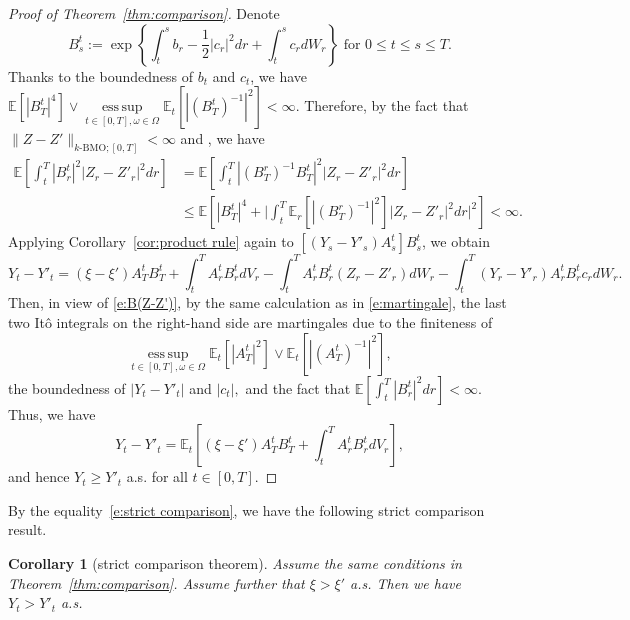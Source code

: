 \documentclass[11pt,reqno]{amsart}
\def\E{\mathbb E}
\newtheorem{corollary}{Corollary}[section]
\DeclareMathOperator*{\esssup}{ess\,sup}
\numberwithin{equation}{section}
\begin{document}
\begin{proof}[Proof of Theorem~\ref{thm:comparison}]
Denote 
\[B^{t}_{s}:=\exp\left\{\int_{t}^{s}b_{r} - \frac{1}{2}|c_{r}|^{2}dr + \int_{t}^{s}c_{r}dW_r\right\} \text{ for } 0\le t\le s\le T.\] Thanks to the boundedness of $b_{t}$ and $c_t$, we have $\mathbb{E}\left[|B^{t}_{T}|^{4}\right]\vee\esssup\limits_{t\in[0,T],\omega\in\Omega}\mathbb{E}_{t}\left[|(B^{t}_{T})^{-1}|^{2}\right]<\infty.$ 
Therefore, by the fact that $\|Z-Z'\|_{k\text{-BMO};[0,T]}<\infty$ and \cite[Corollary~2.1]{kazamaki1994continuous}, we have
\begin{equation}\label{e:B(Z-Z')}
\begin{aligned}
\mathbb{E}\left[\int_{t}^{T}|B^{t}_{r}|^{2}|Z_{r} - Z'_{r}|^{2}dr\right] 
&= \mathbb{E}\left[\int_{t}^{T}\left|(B^{r}_{T})^{-1}B^{t}_{T}\right|^{2}|Z_{r} - Z'_{r}|^{2}dr\right]\\
&\le \mathbb{E}\left[|B_T^t|^4+ \Big|\int_{t}^{T}\mathbb{E}_{r}\left[|(B_T^r)^{-1}|^2\right] |Z_{r} - Z'_{r}|^{2}dr\Big|^{2}\right]<\infty.
\end{aligned}
\end{equation}
Applying Corollary~\ref{cor:product rule} again to $[(Y_s - Y'_s)A^{t}_{s}]B^{t}_s$, we obtain
\begin{equation*}
Y_t - Y'_t = (\xi - \xi')A^{t}_{T}B^{t}_{T} + \int_{t}^{T}A^{t}_r B^{t}_r dV_r - \int_{t}^{T} A^{t}_rB^{t}_r (Z_r - Z'_r) dW_r  - \int_{t}^{T} (Y_r - Y'_r) A^{t}_{r}B^{t}_r c_r dW_r.
\end{equation*}
Then, in view of \eqref{e:B(Z-Z')}, by the same calculation as in \eqref{e:martingale}, the last two It\^o integrals on the right-hand side are martingales due to the finiteness of 
\[\esssup\limits_{t\in[0,T],\omega\in\Omega}\mathbb{E}_{t}\left[|A^{t}_{T}|^{2}\right]\vee\mathbb{E}_{t}\left[|(A^{t}_{T})^{-1}|^{2}\right],\]
the boundedness of $|Y_t-Y'_t|$ and $|c_t|,$ and the fact that $\E[\int_{t}^{T}|B^{t}_{r}|^{2}dr]<\infty$.  Thus, we have 
\begin{equation}\label{e:strict comparison}
Y_t-Y'_t = \mathbb{E}_{t}\left[(\xi - \xi')A^{t}_{T}B^{t}_{T} + \int_{t}^{T}A^{t}_r B^{t}_r dV_r\right],
\end{equation}
and hence $Y_{t} \ge  Y'_{t}$  a.s. for all $t\in[0,T]$.
\end{proof}

By the equality~\eqref{e:strict comparison}, we have the following strict comparison result.

\begin{corollary}[strict comparison theorem]\label{cor:strict compar}
Assume the same conditions in Theorem~\ref{thm:comparison}. Assume further that $\xi > \xi'$ a.s. Then we have $Y_{t}>Y'_{t}$ a.s.
\end{corollary}
\end{document}
